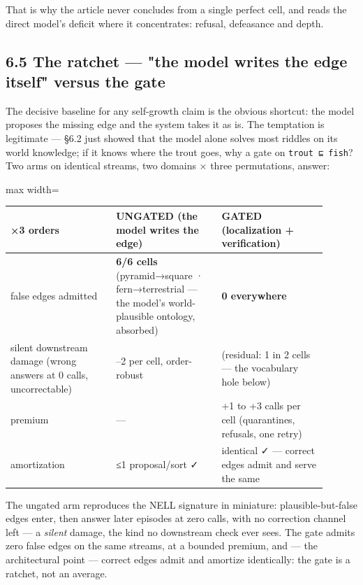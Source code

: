 \documentclass[11pt]{article}
\begin{document}
That is why the article never concludes from a single perfect cell, and reads the direct model's deficit where it concentrates: refusal, defeasance and depth.

\subsection*{6.5 The ratchet — "the model writes the edge itself" versus the gate}

The decisive baseline for any self-growth claim is the obvious shortcut: the model proposes the missing edge and the system takes it as is. The temptation is legitimate — §6.2 just showed that the model alone solves most riddles on its world knowledge; if it knows where the trout goes, why a gate on \texttt{trout ⊑ fish}? Two arms on identical streams, two domains × three permutations, answer:

\begin{center}\small\begin{adjustbox}{max width=\linewidth}\begin{tabular}{>{\raggedright\arraybackslash}p{0.301\linewidth}>{\raggedright\arraybackslash}p{0.301\linewidth}>{\raggedright\arraybackslash}p{0.301\linewidth}}\toprule
×3 orders & UNGATED (the model writes the edge) & GATED (localization + verification) \\ \midrule
false edges admitted & \textbf{6/6 cells} (pyramid→square · fern→terrestrial — the model's world-plausible ontology, absorbed) & \textbf{0 everywhere} \\
silent downstream damage (wrong answers at 0 calls, uncorrectable) & 1–2 per cell, order-robust & 0 (residual: 1 in 2 cells — the vocabulary hole below) \\
premium & — & +1 to +3 calls per cell (quarantines, refusals, one retry) \\
amortization & ≤1 proposal/sort ✓ & identical ✓ — correct edges admit and serve the same \\
\bottomrule\end{tabular}\end{adjustbox}\end{center}

The ungated arm reproduces the NELL signature in miniature: plausible-but-false edges enter, then answer later episodes at zero calls, with no correction channel left — a \emph{silent} damage, the kind no downstream check ever sees. The gate admits zero false edges on the same streams, at a bounded premium, and — the architectural point — correct edges admit and amortize identically: the gate is a ratchet, not an average.
\end{document}
